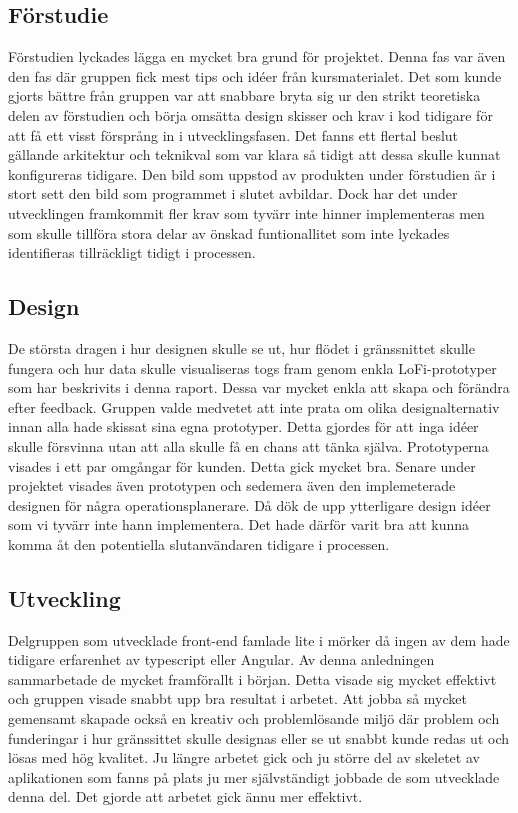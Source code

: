 \subsection{Förstudie}
Förstudien lyckades lägga en mycket bra grund för projektet. Denna fas var även den fas där gruppen fick mest tips och idéer från kursmaterialet. Det som kunde gjorts bättre från gruppen var att snabbare bryta sig ur den strikt teoretiska delen av förstudien och börja omsätta design skisser och krav i kod tidigare för att få ett visst försprång in i utvecklingsfasen. Det fanns ett flertal beslut gällande arkitektur och teknikval som var klara så tidigt att dessa skulle kunnat konfigureras tidigare. Den bild som uppstod av produkten under förstudien är i stort sett den bild som programmet i slutet avbildar. Dock har det under utvecklingen framkommit fler krav som tyvärr inte hinner implementeras men som skulle tillföra stora delar av önskad funtionallitet som inte lyckades identifieras tillräckligt tidigt i processen.

\subsection{Design}
De största dragen i hur designen skulle se ut, hur flödet i gränssnittet skulle fungera och hur data skulle visualiseras togs fram genom enkla LoFi-prototyper som har beskrivits i denna raport. Dessa var mycket enkla att skapa och förändra efter feedback. Gruppen valde medvetet att inte prata om olika designalternativ innan alla hade skissat sina egna prototyper. Detta gjordes för att inga idéer skulle försvinna utan att alla skulle få en chans att tänka själva. Prototyperna visades i ett par omgångar för kunden. Detta gick mycket bra. Senare under projektet visades även prototypen och sedemera även den implemeterade designen för några operationsplanerare. Då dök de upp ytterligare design idéer som vi tyvärr inte hann implementera. Det hade därför varit bra att kunna komma åt den potentiella slutanvändaren tidigare i processen.


\subsection{Utveckling}
Delgruppen som utvecklade front-end famlade lite i mörker då ingen av dem hade tidigare erfarenhet av typescript eller Angular. Av denna anledningen sammarbetade de mycket framförallt i början. Detta visade sig mycket effektivt och gruppen visade snabbt upp bra resultat i arbetet. Att jobba så mycket gemensamt skapade också en kreativ och problemlösande miljö där problem och funderingar i hur gränssittet skulle designas eller se ut snabbt kunde redas ut och lösas med hög kvalitet. Ju längre arbetet gick och ju större del av skeletet av aplikationen som fanns på plats ju mer självständigt jobbade de som utvecklade denna del. Det gjorde att arbetet gick ännu mer effektivt.

